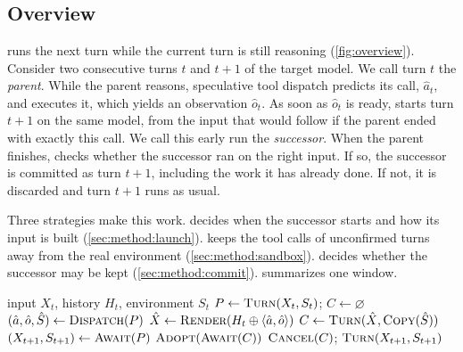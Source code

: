 \section{\method}
\label{sec:method}

\subsection{Overview}
\label{sec:method:overview}

\method runs the next turn while the current turn is still reasoning (\cref{fig:overview}).
Consider two consecutive turns $t$ and $t{+}1$ of the target model.
We call turn $t$ the \emph{parent}.
While the parent reasons, speculative tool dispatch predicts its call, $\hat a_t$, and executes it, which yields an observation $\hat o_t$.
As soon as $\hat o_t$ is ready, \method starts turn $t{+}1$ on the same model, from the input that would follow if the parent ended with exactly this call.
We call this early run the \emph{successor}.
When the parent finishes, \method checks whether the successor ran on the right input.
If so, the successor is committed as turn $t{+}1$, including the work it has already done.
If not, it is discarded and turn $t{+}1$ runs as usual.

Three strategies make this work.
\stratLaunch decides when the successor starts and how its input is built (\cref{sec:method:launch}).
\stratSandbox keeps the tool calls of unconfirmed turns away from the real environment (\cref{sec:method:sandbox}).
\stratCommit decides whether the successor may be kept (\cref{sec:method:commit}).
 summarizes one window.

\begin{algorithm}[t]
\caption{One \method window. \textsc{Turn} runs one turn of the target model; \textsc{Check} is the test of \cref{sec:method:commit}.}
\label{alg:window}
\small
\begin{algorithmic}[1]
\Require input $X_t$, history $H_t$, environment $S_t$
\State $P \gets \textsc{Turn}(X_t, S_t)$;\; $C \gets \varnothing$
\State $(\hat a,\hat o,\hat S) \gets \textsc{Dispatch}(P)$ 
 \Comment{\S\ref{sec:method:launch}}
  \State $\hat X \gets \textsc{Render}(H_t\oplus\langle\hat a,\hat o\rangle)$
  \State $C \gets \textsc{Turn}(\hat X, \textsc{Copy}(\hat S))$ \Comment{\S\ref{sec:method:sandbox}}
\EndIf
\State $(X_{t+1}, S_{t+1}) \gets \textsc{Await}(P)$
 \Comment{\S\ref{sec:method:commit}}
  \State $\textsc{Adopt}(\textsc{Await}(C))$
\Else
  \State $\textsc{Cancel}(C)$;\; $\textsc{Turn}(X_{t+1}, S_{t+1})$
\EndIf
\end{algorithmic}
\end{algorithm}

